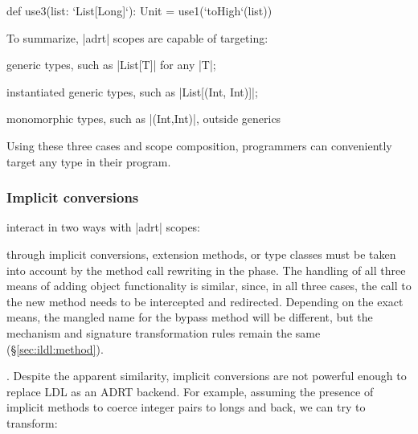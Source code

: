 \begin{lstlisting-nobreak}
def use3(list: `List[Long]`): Unit = use1(`toHigh`(list))
\end{lstlisting-nobreak}

To summarize, |adrt| scopes are capable of targeting:

\vspace{0.3em}
\begin{compactitem}
\item generic types, such as |List[T]| for any |T|;
\item instantiated generic types, such as |List[(Int, Int)]|;
\item monomorphic types, such as |(Int,Int)|, outside generics
\end{compactitem}
\vspace{0.3em}

\noindent
Using these three cases and scope composition, programmers can conveniently target any type in their program.

\subsubsection{Implicit conversions}
\label{sec:ildl:language-implicit-conversions}
interact in two ways with |adrt| scopes:

\vspace{0.3em}
\noindent
{} through implicit conversions, extension methods, or type classes must be taken into account by the method call rewriting in the \coerce{} phase. The handling of all three means of adding object functionality is similar, since, in all three cases, the call to the new method needs to be intercepted and redirected. Depending on the exact means, the mangled name for the bypass method will be different, but the mechanism and signature transformation rules remain the same (\S\ref{sec:ildl:method}).

\vspace{0.3em}
\noindent
{}. Despite the apparent similarity, implicit conversions are not powerful enough 
to replace LDL as an ADRT backend. For example, assuming the presence of implicit methods to coerce integer pairs to longs and back, we can try to transform:

